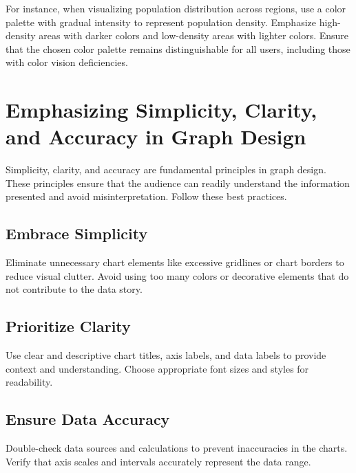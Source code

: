 \documentclass[
]{book}
\begin{document}
For instance, when visualizing population distribution across regions, use a color palette with gradual intensity to represent population density. Emphasize high-density areas with darker colors and low-density areas with lighter colors. Ensure that the chosen color palette remains distinguishable for all users, including those with color vision deficiencies.

\hypertarget{emphasizing-simplicity-clarity-and-accuracy-in-graph-design}{%
\section{Emphasizing Simplicity, Clarity, and Accuracy in Graph Design}\label{emphasizing-simplicity-clarity-and-accuracy-in-graph-design}}

Simplicity, clarity, and accuracy are fundamental principles in graph design. These principles ensure that the audience can readily understand the information presented and avoid misinterpretation. Follow these best practices.

\hypertarget{embrace-simplicity}{%
\subsection{Embrace Simplicity}\label{embrace-simplicity}}

Eliminate unnecessary chart elements like excessive gridlines or chart borders to reduce visual clutter.
Avoid using too many colors or decorative elements that do not contribute to the data story.

\hypertarget{prioritize-clarity}{%
\subsection{Prioritize Clarity}\label{prioritize-clarity}}

Use clear and descriptive chart titles, axis labels, and data labels to provide context and understanding.
Choose appropriate font sizes and styles for readability.

\hypertarget{ensure-data-accuracy}{%
\subsection{Ensure Data Accuracy}\label{ensure-data-accuracy}}

Double-check data sources and calculations to prevent inaccuracies in the charts.
Verify that axis scales and intervals accurately represent the data range.
\end{document}
